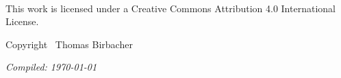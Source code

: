 \newpage
~\vfill
\thispagestyle{empty}
\setlength{\parindent}{0pt}
\setlength{\parskip}{\baselineskip}





\Huge
\ccbyncsa
\normalsize

This work is licensed under a Creative Commons Attribution 4.0 International License.

Copyright \the\year\ Thomas Birbacher

\email


\par\textit{Compiled: \today}
